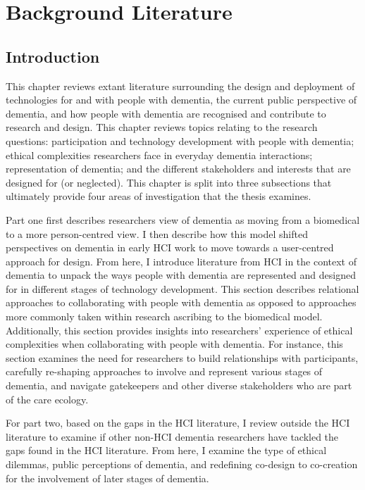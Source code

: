 \chapter{Background Literature}
\label{BackgroundLit}

\section{Introduction}
\label{BL:Intro}
This chapter reviews extant literature surrounding the design and deployment of technologies for and with people with dementia, the current public perspective of dementia, and how people with dementia are recognised and contribute to research and design. This chapter reviews topics relating to the research questions: participation and technology development with people with dementia; ethical complexities researchers face in everyday dementia interactions; representation of dementia; and the different stakeholders and interests that are designed for (or neglected). This chapter is split into three subsections that ultimately provide four areas of investigation that the thesis examines.

Part one first describes researchers view of dementia as moving from a biomedical to a more person-centred view. I then describe how this model shifted perspectives on dementia in early HCI work to move towards a user-centred approach for design. From here, I introduce literature from HCI in the context of dementia to unpack the ways people with dementia are represented and designed for in different stages of technology development. This section describes relational approaches to collaborating with people with dementia as opposed to approaches more commonly taken within research ascribing to the biomedical model. Additionally, this section provides insights into researchers' experience of ethical complexities when collaborating with people with dementia. For instance, this section examines the need for researchers to build relationships with participants, carefully re-shaping approaches to involve and represent various stages of dementia, and navigate gatekeepers and other diverse stakeholders who are part of the care ecology.

For part two, based on the gaps in the HCI literature, I review outside the HCI literature to examine if other non-HCI dementia researchers have tackled the gaps found in the HCI literature. From here, I examine the type of ethical dilemmas, public perceptions of dementia, and redefining co-design to co-creation for the involvement of later stages of dementia.

